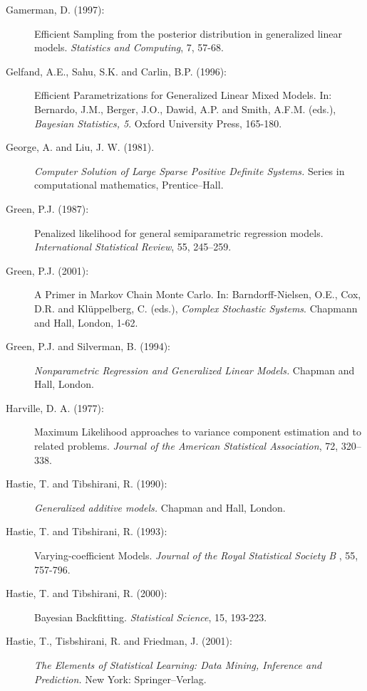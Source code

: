 \documentclass[11pt,a4paper,twoside]{bayesxarticle}
\begin{document}
\begin{description}
\item[Gamerman, D. (1997):] Efficient Sampling from the posterior distribution
in generalized linear models. {\em Statistics and Computing}, 7,
57-68.

\item[Gelfand, A.E., Sahu, S.K. and Carlin, B.P. (1996):] Efficient Parametrizations for
Generalized Linear Mixed Models. In: Bernardo, J.M., Berger, J.O.,
Dawid, A.P. and Smith, A.F.M. (eds.), {\em Bayesian Statistics,
5}. Oxford University Press, 165-180.

\item[George, A. and Liu, J. W. (1981).] {\em Computer Solution of Large
Sparse Positive Definite Systems.} Series in computational
mathematics, Prentice--Hall.

\item[Green, P.J. (1987):] Penalized
likelihood for general semiparametric regression models. {\it
International Statistical Review}, 55, 245--259.

\item[Green, P.J. (2001):] A Primer in Markov Chain Monte Carlo. In: Barndorff-Nielsen, O.E.,
Cox, D.R. and Kl\"{u}ppelberg, C. (eds.), {\em Complex Stochastic
Systems}. Chapmann and Hall, London, 1-62.

\item[Green, P.J. and Silverman, B. (1994):] {\em Nonparametric Regression and Generalized Linear Models.} Chapman
and Hall, London.

\item[Harville, D. A. (1977):]
Maximum Likelihood approaches to variance component estimation and
to related problems. {\it Journal of the American Statistical
Association}, 72, 320--338.


\item[Hastie, T. and Tibshirani, R. (1990):] {\em Generalized additive models.} Chapman and
Hall, London.

\item[Hastie, T. and Tibshirani, R. (1993):] Varying-coefficient Models.
{\em Journal of the Royal Statistical Society B} , 55, 757-796.

\item[Hastie, T. and Tibshirani, R. (2000):] Bayesian Backfitting. {\em Statistical Science}, 15, 193-223.

\item[Hastie, T., Tisbshirani, R. and Friedman, J. (2001):] {\em The Elements of Statistical Learning: Data Mining,
Inference and Prediction.} New York: Springer--Verlag.


\end{description}
\end{document}
